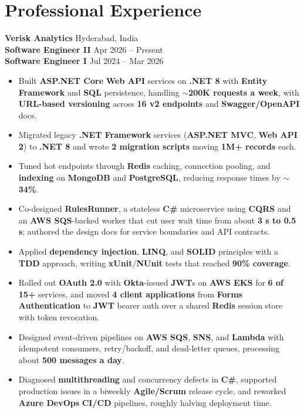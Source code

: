 \documentclass[a4paper,10pt]{article}
\begin{document}
\section*{Professional Experience}

\textbf{Verisk Analytics} \hfill Hyderabad, India \\
\textbf{Software Engineer II} \hfill Apr 2026 -- Present \\
\textbf{Software Engineer I} \hfill Jul 2024 -- Mar 2026

\begin{itemize}[leftmargin=*]
    \item Built \textbf{ASP.NET Core} \textbf{Web API} services on \textbf{.NET 8} with \textbf{Entity Framework} and \textbf{SQL} persistence, handling \textbf{${\sim}$200K requests a week}, with \textbf{URL-based versioning} across \textbf{16 v2 endpoints} and \textbf{Swagger/OpenAPI} docs.
    \item Migrated legacy \textbf{.NET Framework} services (\textbf{ASP.NET MVC}, \textbf{Web API 2}) to \textbf{.NET 8} and wrote \textbf{2 migration scripts} moving \textbf{1M+ records} each.
    \item Tuned hot endpoints through \textbf{Redis} caching, connection pooling, and \textbf{indexing} on \textbf{MongoDB} and \textbf{PostgreSQL}, reducing response times by ${\sim}$\textbf{34\%}.
    \item Co-designed \textbf{RulesRunner}, a stateless \textbf{C\#} microservice using \textbf{CQRS} and an \textbf{AWS SQS}-backed worker that cut user wait time from about \textbf{3 s to 0.5 s}; authored the design docs for service boundaries and API contracts.
    \item Applied \textbf{dependency injection}, \textbf{LINQ}, and \textbf{SOLID} principles with a \textbf{TDD} approach, writing \textbf{xUnit}/\textbf{NUnit} tests that reached \textbf{90\% coverage}.
    \item Rolled out \textbf{OAuth 2.0} with \textbf{Okta}-issued \textbf{JWT}s on \textbf{AWS EKS} for \textbf{6 of 15+} services, and moved \textbf{4 client applications} from \textbf{Forms Authentication} to \textbf{JWT} bearer auth over a shared \textbf{Redis} session store with token revocation.
    \item Designed event-driven pipelines on \textbf{AWS SQS}, \textbf{SNS}, and \textbf{Lambda} with idempotent consumers, retry/backoff, and dead-letter queues, processing about \textbf{500 messages a day}.
    \item Diagnosed \textbf{multithreading} and concurrency defects in \textbf{C\#}, supported production issues in a biweekly \textbf{Agile/Scrum} release cycle, and reworked \textbf{Azure DevOps} \textbf{CI/CD} pipelines, roughly halving deployment time.

\end{itemize}
\end{document}

